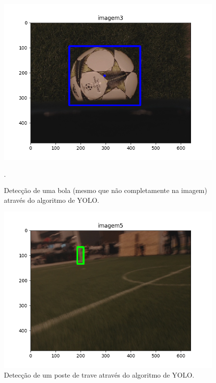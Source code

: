 \documentclass[conference]{IEEEtran}
\begin{document}
\begin{figure}[htbp]
\centering
\centerline{\includegraphics[scale=0.5]{imagens/imagem3_detection.png}}
\caption{Detecção de uma bola (mesmo que não completamente na imagem) através do algoritmo de YOLO.}.
\label{imagem3_detection}
\end{figure}


\begin{figure}[htbp]
\centering
\centerline{\includegraphics[scale=0.5]{imagens/imagem5_detection.png}}
\caption{Detecção de um poste de trave através do algoritmo de YOLO.}
\label{imagem5_detection}
\end{figure}
\end{document}
